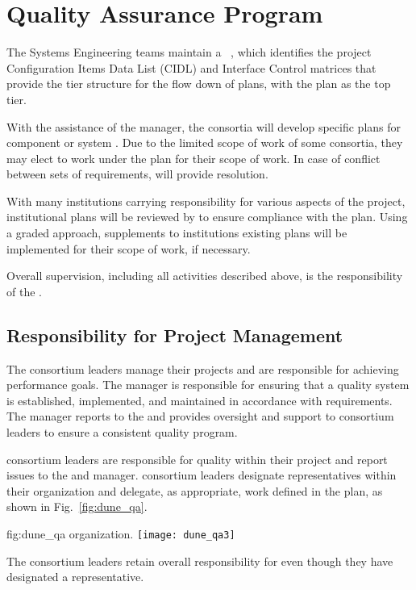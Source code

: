 \section{Quality Assurance Program}

The  Systems Engineering teams maintain a
 ~\cite{bib:docdb82}, which identifies the  project
Configuration Items Data List (CIDL) and Interface Control matrices
that provide the tier structure for the flow down of  plans,
with the   plan as the top tier.

With the
assistance of the   manager, the consortia will develop specific  plans  for
component or system . Due to the limited scope of
work of some consortia, they may elect to work under the
  plan for their scope of work. In
case of conflict between sets of  requirements, 
 will provide resolution.

With many institutions carrying responsibility for various aspects of
the project, institutional  plans will be reviewed by
  to ensure compliance with the
  plan. Using a graded approach,
supplements to institutions existing plans will be implemented for
their  scope of work, if necessary.

Overall  supervision, including all activities described
above, is the responsibility of the  .

\subsection{Responsibility for Project Management}

The  consortium leaders manage their projects and are
responsible for achieving performance goals. The
  manager is responsible for
ensuring that a quality system is established, implemented, and
maintained in accordance with requirements. The
  manager reports to the
  and provides oversight and support to
consortium leaders to ensure a consistent quality program.

 consortium leaders are responsible for quality within
their project and report  issues to the 
 and  
manager.  consortium leaders designate 
representatives within their organization and delegate, as appropriate, 
work defined in the   plan, as
shown in Fig.~\ref{fig:dune_qa}.
\begin{dunefigure}{fig:dune_qa}
  {  organization.}
  \texttt{[image: dune\_qa3]}
\end{dunefigure}
The  consortium leaders retain overall responsibility for
 even though they have designated a 
representative.

